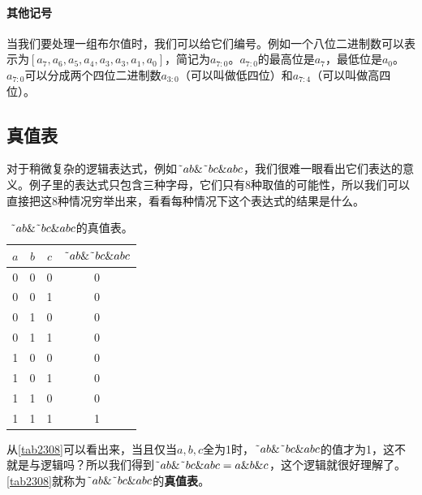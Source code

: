 \paragraph*{其他记号}
当我们要处理一组布尔值时，我们可以给它们编号。例如一个八位二进制数可以表示为$[a_7,a_6,a_5,a_4,a_3,a_3,a_1,a_0]$，简记为$a_{7:0}$。$a_{7:0}$的最高位是$a_7$，最低位是$a_0$。$a_{7:0}$可以分成两个四位二进制数$a_{3:0}$（可以叫做低四位）和$a_{7:4}$（可以叫做高四位）。

\subsection{真值表}
对于稍微复杂的逻辑表达式，例如$\textrm{\~{}}ab\&\textrm{\~{}}bc\&abc$，我们很难一眼看出它们表达的意义。例子里的表达式只包含三种字母，它们只有8种取值的可能性，所以我们可以直接把这8种情况穷举出来，看看每种情况下这个表达式的结果是什么。

\begin{table}[!ht]
\centering
\begin{tabular}{|c|c|c||c|}
\hline
$a$&$b$&$c$&$\textrm{\~{}}ab\&\textrm{\~{}}bc\&abc$\\\hline
0&0&0&0\\\hline
0&0&1&0\\\hline
0&1&0&0\\\hline
0&1&1&0\\\hline
1&0&0&0\\\hline
1&0&1&0\\\hline
1&1&0&0\\\hline
1&1&1&1\\\hline
\end{tabular}
\caption{$\textrm{\~{}}ab\&\textrm{\~{}}bc\&abc$的真值表。}\label{tab2308}
\end{table}

从\autoref{tab2308}可以看出来，当且仅当$a,b,c$全为1时，$\textrm{\~{}}ab\&\textrm{\~{}}bc\&abc$的值才为1，这不就是与逻辑吗？所以我们得到$\textrm{\~{}}ab\&\textrm{\~{}}bc\&abc=a\&b\&c$，这个逻辑就很好理解了。\autoref{tab2308}就称为$\textrm{\~{}}ab\&\textrm{\~{}}bc\&abc$的\textbf{真值表}。

